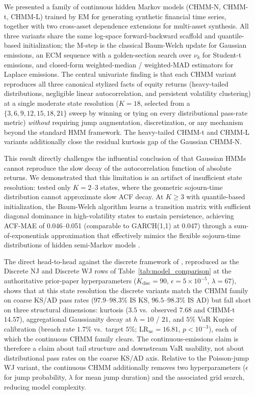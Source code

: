 We presented a family of continuous hidden Markov models (CHMM-N, CHMM-t, CHMM-L) trained by EM for generating synthetic financial time series, together with two cross-asset dependence extensions for multi-asset synthesis.
All three variants share the same log-space forward-backward scaffold and quantile-based initialization; the M-step is the classical Baum-Welch update for Gaussian emissions, an ECM sequence with a golden-section search over $\nu_k$ for Student-t emissions, and closed-form weighted-median / weighted-MAD estimators for Laplace emissions.
The central univariate finding is that each CHMM variant reproduces all three canonical stylized facts of equity returns (heavy-tailed distributions, negligible linear autocorrelation, and persistent volatility clustering) at a single moderate state resolution ($K = 18$, selected from a $\{3, 6, 9, 12, 15, 18, 21\}$ sweep by winning or tying on every distributional pass-rate metric) \emph{without} requiring jump augmentation, discretization, or any mechanism beyond the standard HMM framework.
The heavy-tailed CHMM-t and CHMM-L variants additionally close the residual kurtosis gap of the Gaussian CHMM-N.

This result directly challenges the influential conclusion of \citet{ryden1998stylized} that Gaussian HMMs cannot reproduce the slow decay of the autocorrelation function of absolute returns.
We demonstrated that this limitation is an artifact of insufficient state resolution: \citet{ryden1998stylized} tested only $K = 2$--$3$ states, where the geometric sojourn-time distribution cannot approximate slow ACF decay.
At $K \geq 3$ with quantile-based initialization, the Baum-Welch algorithm learns a transition matrix with sufficient diagonal dominance in high-volatility states to sustain persistence, achieving ACF-MAE of 0.046--0.051 (comparable to GARCH(1,1) at 0.047) through a sum-of-exponentials approximation that effectively mimics the flexible sojourn-time distributions of hidden semi-Markov models \cite{bulla2006stylized}.

The direct head-to-head against the discrete framework of \citet{alswaidan2026hybrid}, reproduced as the Discrete NJ and Discrete WJ rows of Table~\ref{tab:model_comparison} at the authoritative prior-paper hyperparameters ($K_{\text{disc}} = 90$, $\epsilon = 5 \times 10^{-5}$, $\lambda = 67$), shows that at this state resolution the discrete variants match the CHMM family on coarse KS/AD pass rates ($97.9$--$98.3\%$ IS KS, $96.5$--$98.3\%$ IS AD) but fall short on three structural dimensions: kurtosis ($3.5$ vs.\ observed $7.68$ and CHMM-t $14.57$), aggregational Gaussianity decay at $h = 10$ / $21$, and $5\%$ VaR Kupiec calibration (breach rate $1.7\%$ vs.\ target $5\%$; $\text{LR}_{\text{uc}} = 16.81$, $p < 10^{-3}$), each of which the continuous CHMM family clears.
The continuous-emissions claim is therefore a claim about tail structure and downstream VaR usability, not about distributional pass rates on the coarse KS/AD axis.
Relative to the Poisson-jump WJ variant, the continuous CHMM additionally removes two hyperparameters ($\epsilon$ for jump probability, $\lambda$ for mean jump duration) and the associated grid search, reducing model complexity.

